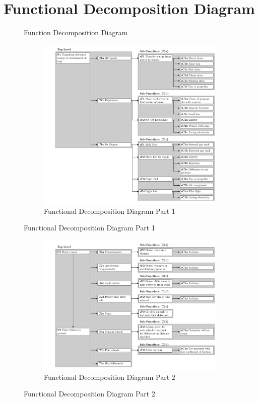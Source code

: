 \documentclass[class=../../report, crop=false]{standalone}
\begin{document}
\section{Functional Decomposition Diagram} \label{app:funcdecomp}

\begin{figure}[!h]
	\caption{Function Decomposition Diagram}
\end{figure}

\begin{figure}[!htb]
	\ContinuedFloat
	\begin{subfigure}{\textwidth}
		\centering
		\includegraphics[width=\textwidth]{../../../bin/funcdecomp-1}
		\caption{Functional Decomposition Diagram Part 1}
	\end{subfigure}
\end{figure}

\begin{figure}[!htb]
	\ContinuedFloat
	\begin{subfigure}{\textwidth}
		\centering
		\includegraphics[width=\textwidth]{../../../bin/funcdecomp-2}
		\caption{Functional Decomposition Diagram Part 2}
	\end{subfigure}
\end{figure}
\end{document}
